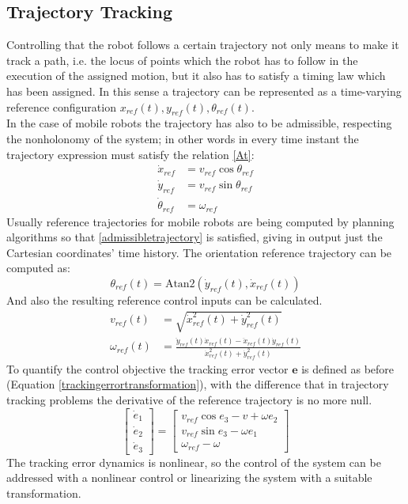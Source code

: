 \subsection{Trajectory Tracking}
Controlling that the robot follows a certain trajectory not only means to make it track a path, i.e. the locus of points which the robot has to follow in the execution of the assigned motion, but it also has to satisfy a timing law which has been assigned. In this sense a trajectory can be represented as a time-varying reference configuration $x_{ref}(t),y_{ref}(t),\theta_{ref}(t)$. \\In the case of mobile robots the trajectory has also to be admissible, respecting the nonholonomy of the system; in other words in every time instant the trajectory expression must satisfy the relation \ref{At}:
\begin{equation} \label{admissibletrajectory}
	\begin{split}
		\dot{x}_{ref} &= v_{ref}\cos\theta_{ref}\\
		\dot{y}_{ref} &= v_{ref}\sin\theta_{ref}\\
		\dot{\theta}_{ref}&=\omega_{ref}
	\end{split}
\end{equation}
Usually reference trajectories for mobile robots are being computed by planning algorithms so that \ref{admissibletrajectory} is satisfied, giving in output just the Cartesian coordinates' time history. The orientation reference trajectory can be computed as:
\begin{equation}
	\theta_{ref}(t)=\text{Atan2}(\dot{y}_{ref}(t),\dot{x}_{ref}(t)) 
\end{equation}
 And also the resulting reference control inputs can be calculated.
 \begin{align}
 	v_{ref}(t)&=\sqrt{\dot{x}_{ref}^2(t)+\dot{y}_{ref}^2(t)}\\
 	\omega_{ref}(t)&=\frac{\ddot{y}_{ref}(t)\dot{x}_{ref}(t)-\ddot{x}_{ref}(t)\dot{y}_{ref}(t)}{\dot{x}^2_{ref}(t)+\dot{y}^2_{ref}(t)}
 \end{align}
 To quantify the control objective the tracking error vector $\mathbf{e}$ is defined as before (Equation \ref{trackingerrortransformation}), with the difference that in trajectory tracking problems the derivative of the reference trajectory is no more null.
 \begin{equation}
 	\left[\begin{matrix}
 		\dot{e}_1\\\dot{e}_2\\\dot{e}_3
 	\end{matrix}\right] = 
 	\left[\begin{matrix}
	 	v_{ref}\cos e_3 - v+\omega e_2\\v_{ref}\sin e_3-\omega e_1\\\omega_{ref}-\omega
 	\end{matrix}\right]
 \end{equation}
 The tracking error dynamics is nonlinear, so the control of the system can be addressed with a nonlinear control or linearizing the system with a suitable transformation.

